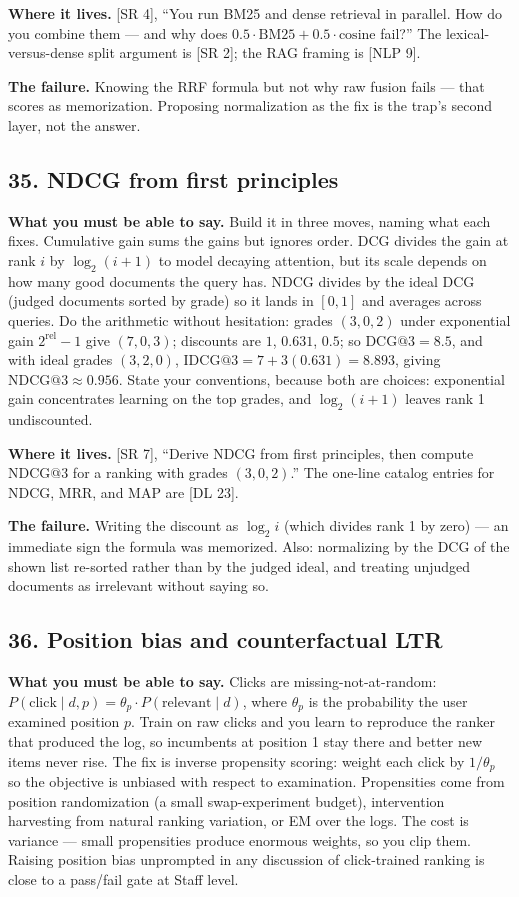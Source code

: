 \textbf{Where it lives.} [SR 4], ``You run BM25 and dense retrieval in parallel. How do you combine them --- and why does $0.5\cdot\mathrm{BM25} + 0.5\cdot\mathrm{cosine}$ fail?'' The lexical-versus-dense split argument is [SR 2]; the RAG framing is [NLP 9].

\textbf{The failure.} Knowing the RRF formula but not why raw fusion fails --- that scores as memorization. Proposing normalization as the fix is the trap's second layer, not the answer.

\subsection*{35. NDCG from first principles}

\textbf{What you must be able to say.} Build it in three moves, naming what each fixes. Cumulative gain sums the gains but ignores order. DCG divides the gain at rank $i$ by $\log_2(i + 1)$ to model decaying attention, but its scale depends on how many good documents the query has. NDCG divides by the ideal DCG (judged documents sorted by grade) so it lands in $[0,1]$ and averages across queries. Do the arithmetic without hesitation: grades $(3,0,2)$ under exponential gain $2^{\mathrm{rel}} - 1$ give $(7,0,3)$; discounts are $1$, $0.631$, $0.5$; so $\mathrm{DCG@}3 = 8.5$, and with ideal grades $(3,2,0)$, $\mathrm{IDCG@}3 = 7 + 3(0.631) = 8.893$, giving $\mathrm{NDCG@}3 \approx 0.956$. State your conventions, because both are choices: exponential gain concentrates learning on the top grades, and $\log_2(i+1)$ leaves rank 1 undiscounted.

\textbf{Where it lives.} [SR 7], ``Derive NDCG from first principles, then compute NDCG@3 for a ranking with grades $(3,0,2)$.'' The one-line catalog entries for NDCG, MRR, and MAP are [DL 23].

\textbf{The failure.} Writing the discount as $\log_2 i$ (which divides rank 1 by zero) --- an immediate sign the formula was memorized. Also: normalizing by the DCG of the shown list re-sorted rather than by the judged ideal, and treating unjudged documents as irrelevant without saying so.

\subsection*{36. Position bias and counterfactual LTR}

\textbf{What you must be able to say.} Clicks are missing-not-at-random: $P(\text{click} \mid d, p) = \theta_p \cdot P(\text{relevant} \mid d)$, where $\theta_p$ is the probability the user examined position $p$. Train on raw clicks and you learn to reproduce the ranker that produced the log, so incumbents at position 1 stay there and better new items never rise. The fix is inverse propensity scoring: weight each click by $1/\theta_p$ so the objective is unbiased with respect to examination. Propensities come from position randomization (a small swap-experiment budget), intervention harvesting from natural ranking variation, or EM over the logs. The cost is variance --- small propensities produce enormous weights, so you clip them. Raising position bias unprompted in any discussion of click-trained ranking is close to a pass/fail gate at Staff level.

